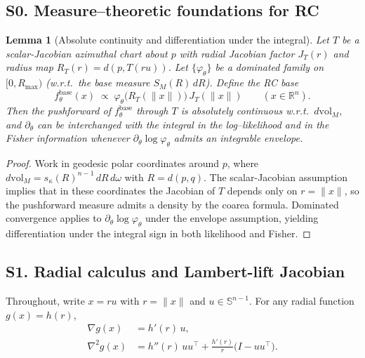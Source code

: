 \documentclass{article}
\newtheorem{lemma}{Lemma}
\theoremstyle{definition}
\theoremstyle{remark}
\newcommand{\SSS}{\mathbb{S}}
\begin{document}

\subsection*{S0. Measure--theoretic foundations for RC}

\begin{lemma}[Absolute continuity and differentiation under the integral]
Let $T$ be a scalar-Jacobian azimuthal chart about $p$ with radial Jacobian factor $J_T(r)$
and radius map $R_T(r)=d(p,T(ru))$.
Let $\{\varphi_\theta\}$ be a dominated family on $[0,R_{\max})$ (w.r.t.\ the base measure
$S_M(R)\,dR$). Define the RC base
\[
f^{\mathrm{base}}_\theta(x)\;\propto\;\varphi_\theta\!\bigl(R_T(\|x\|)\bigr)\,J_T(\|x\|)
\qquad (x\in\mathbb R^n).
\]
Then the pushforward of $f^{\mathrm{base}}_\theta$ through $T$ is absolutely continuous w.r.t.\
$d\mathrm{vol}_M$, and $\partial_\theta$ can be interchanged with the integral in the log--likelihood and in
the Fisher information whenever $\partial_\theta\log\varphi_\theta$ admits an integrable envelope.
\end{lemma}

\begin{proof}
Work in geodesic polar coordinates around $p$, where
$d\mathrm{vol}_M = s_\kappa(R)^{n-1}\,dR\,d\omega$ with $R=d(p,q)$.
The scalar-Jacobian assumption implies that in these coordinates the Jacobian of $T$ depends only on $r=\|x\|$,
so the pushforward measure admits a density by the coarea formula.
Dominated convergence applies to $\partial_\theta\log\varphi_\theta$ under the envelope assumption, yielding
differentiation under the integral sign in both likelihood and Fisher.
\end{proof}

\subsection*{S1. Radial calculus and Lambert-lift Jacobian}

Throughout, write $x=ru$ with $r=\|x\|$ and $u\in\SSS^{n-1}$.
For any radial function $g(x)=h(r)$,
\begin{align*}
\nabla g(x) &= h'(r)\,u,\\
\nabla^2 g(x) &= h''(r)\,uu^\top + \frac{h'(r)}{r}\bigl(I-uu^\top\bigr).
\end{align*}
\end{document}

